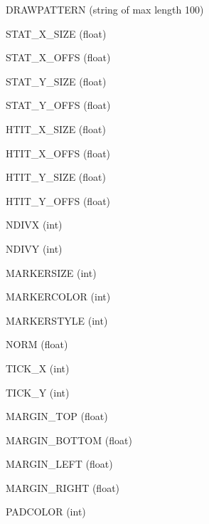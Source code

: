 \item{DRAWPATTERN}  (string of max length 100)
\item{STAT\_X\_SIZE}  (float)
\item{STAT\_X\_OFFS}  (float)
\item{STAT\_Y\_SIZE}  (float)
\item{STAT\_Y\_OFFS}  (float)
\item{HTIT\_X\_SIZE}  (float)
\item{HTIT\_X\_OFFS}  (float)
\item{HTIT\_Y\_SIZE}  (float)
\item{HTIT\_Y\_OFFS}  (float)
\item{NDIVX}  (int)
\item{NDIVY}  (int)
\item{MARKERSIZE}  (int)
\item{MARKERCOLOR}  (int)
\item{MARKERSTYLE}  (int)
\item{NORM}  (float)
\item{TICK\_X}  (int)
\item{TICK\_Y}  (int)
\item{MARGIN\_TOP}  (float)
\item{MARGIN\_BOTTOM}  (float)
\item{MARGIN\_LEFT}  (float)
\item{MARGIN\_RIGHT}  (float)
\item{PADCOLOR}  (int)
